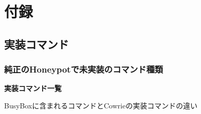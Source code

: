 \appendix
\chapter{付録}
\label{appd}

\section{実装コマンド}

\subsection{純正のHoneypotで未実装のコマンド種類}
\label{appd:kindofcommand}

\begin{center}
\large{\textbf{実装コマンド一覧}}
\end{center}

BusyBoxに含まれるコマンドとCowrieの実装コマンドの違い
 
